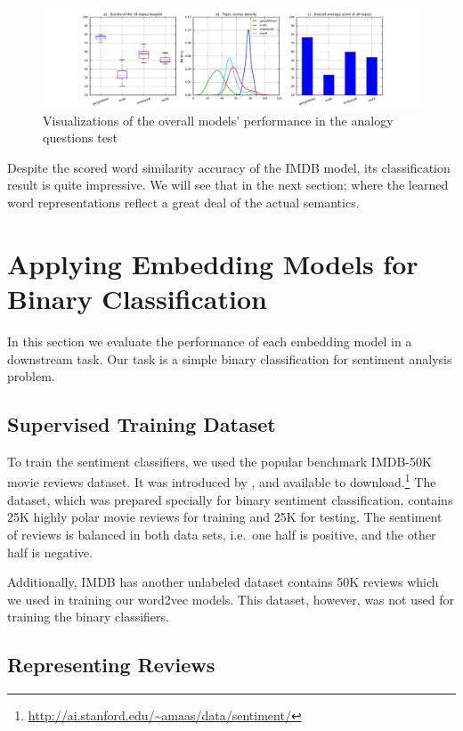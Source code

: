 \documentclass[11pt,letterpaper]{article}
\begin{document}
\begin{figure}[htbp]
\centering
\includegraphics[width=160mm]{img/em-overall.png}
\caption{Visualizations of the overall models' performance in the analogy questions test}
\label{overall_analogy}
\end{figure}

Despite the scored word similarity accuracy of the IMDB model, its
classification result is quite impressive. We will see that in the next
section; where the learned word representations reflect a great deal of
the actual semantics.

\section{Applying Embedding Models for Binary
Classification}\label{applying-embedding-models-for-binary-classification}

In this section we evaluate the performance of each embedding model in a
downstream task. Our task is a simple binary classification for
sentiment analysis problem.

\subsection{Supervised Training
Dataset}\label{supervised-training-dataset}

To train the sentiment classifiers, we used the popular benchmark
IMDB-50K movie reviews dataset. It was introduced by
\citep{maas2011learning}, and available to download.\footnote{\url{http://ai.stanford.edu/~amaas/data/sentiment/}}
The dataset, which was prepared specially for binary sentiment
classification, contains 25K highly polar movie reviews for training and
25K for testing. The sentiment of reviews is balanced in both data sets,
i.e.~one half is positive, and the other half is negative.

Additionally, IMDB has another unlabeled dataset contains 50K reviews
which we used in training our word2vec models. This dataset, however,
was not used for training the binary classifiers.

\subsection{Representing Reviews}\label{representing-reviews}
\end{document}
